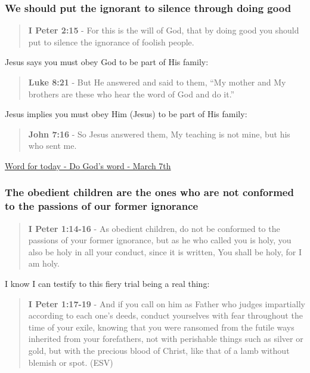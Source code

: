 \documentclass[11pt]{article}
\begin{document}
\subsubsection{We should put the ignorant to silence through doing good}
\label{sec:orge340c39}

\begin{quote}
\textbf{I Peter 2:15} - For this is the will of God, that by doing good you should put to silence the ignorance of foolish people.
\end{quote}

Jesus says you must obey God to be part of His family:

\begin{quote}
\textbf{Luke 8:21} - But He answered and said to them, “My mother and My brothers are these who hear the word of God and do it.”
\end{quote}

Jesus implies you must obey Him (Jesus) to be part of His family:

\begin{quote}
\textbf{John 7:16} - So Jesus answered them, My teaching is not mine, but his who sent me.
\end{quote}

\href{https://www.star.net.nz/the-word-for-today/do-gods-word-2024\_03\_07}{Word for today - Do God's word - March 7th}

\subsubsection{The obedient children are the ones who are not conformed to the passions of our former ignorance}
\label{sec:orgb4498b8}
\begin{quote}
\textbf{I Peter 1:14-16} - As obedient children, do not be conformed to the passions of your former ignorance, but as he who called you is holy, you also be holy in all your conduct, since it is written, You shall be holy, for I am holy.
\end{quote}

I know I can testify to this fiery trial being a real thing:

\begin{quote}
\textbf{I Peter 1:17-19} - And if you call on him as Father who judges impartially according to each one's deeds, conduct yourselves with fear throughout the time of your exile, knowing that you were ransomed from the futile ways inherited from your forefathers, not with perishable things such as silver or gold, but with the precious blood of Christ, like that of a lamb without blemish or spot. (ESV)
\end{quote}
\end{document}

